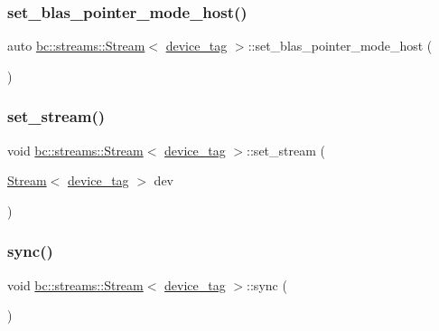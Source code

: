\subsubsection{\texorpdfstring{set\+\_\+blas\+\_\+pointer\+\_\+mode\+\_\+host()}{set\_blas\_pointer\_mode\_host()}}
{\footnotesize\ttfamily auto \hyperlink{classbc_1_1streams_1_1Stream}{bc\+::streams\+::\+Stream}$<$ \hyperlink{structbc_1_1device__tag}{device\+\_\+tag} $>$\+::set\+\_\+blas\+\_\+pointer\+\_\+mode\+\_\+host (\begin{DoxyParamCaption}{ }\end{DoxyParamCaption})\hspace{0.3cm}{\ttfamily [inline]}}

\mbox{\label{classbc_1_1streams_1_1Stream_3_01device__tag_01_4_a36c32c96ed807fd40421d8437e1919f4}} 
\subsubsection{\texorpdfstring{set\+\_\+stream()}{set\_stream()}}
{\footnotesize\ttfamily void \hyperlink{classbc_1_1streams_1_1Stream}{bc\+::streams\+::\+Stream}$<$ \hyperlink{structbc_1_1device__tag}{device\+\_\+tag} $>$\+::set\+\_\+stream (\begin{DoxyParamCaption}\item[{\hyperlink{classbc_1_1streams_1_1Stream}{Stream}$<$ \hyperlink{structbc_1_1device__tag}{device\+\_\+tag} $>$}]{dev }\end{DoxyParamCaption})\hspace{0.3cm}{\ttfamily [inline]}}

\mbox{\label{classbc_1_1streams_1_1Stream_3_01device__tag_01_4_afc2e619f75d90c96a253db36b235caaf}} 
\subsubsection{\texorpdfstring{sync()}{sync()}}
{\footnotesize\ttfamily void \hyperlink{classbc_1_1streams_1_1Stream}{bc\+::streams\+::\+Stream}$<$ \hyperlink{structbc_1_1device__tag}{device\+\_\+tag} $>$\+::sync (\begin{DoxyParamCaption}{ }\end{DoxyParamCaption})\hspace{0.3cm}{\ttfamily [inline]}}

